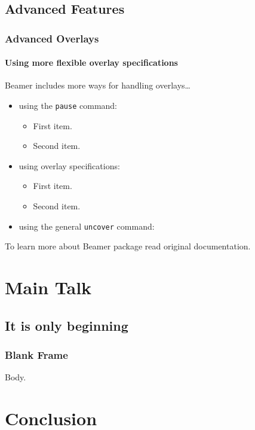 \documentclass{beamer}
\begin{document}
\subsection{Advanced Features}

\begin{frame}
  \frametitle{Advanced Overlays}
  \framesubtitle{Using more flexible overlay specifications}

  Beamer includes more ways for handling 
  overlays\dots
  \begin{itemize}
  \item using the \texttt{pause} command:
    \begin{itemize}
    \item
      First item.
      \pause
    \item    
      Second item.
    \end{itemize}
  \item
    using overlay specifications:
    \begin{itemize}
    \item<3->
      First item.
    \item<4->
      Second item.
    \end{itemize}
  \item
    using the general \texttt{uncover} command:
    \begin{itemize}
    \end{itemize}
  \end{itemize}

  To learn more about Beamer package 
  read original documentation.

\end{frame}

\section{Main Talk}

\subsection{It is only beginning}

\begin{frame}
  \frametitle{Blank Frame}
  Body.
\end{frame}

\section*{Conclusion}
\end{document}
